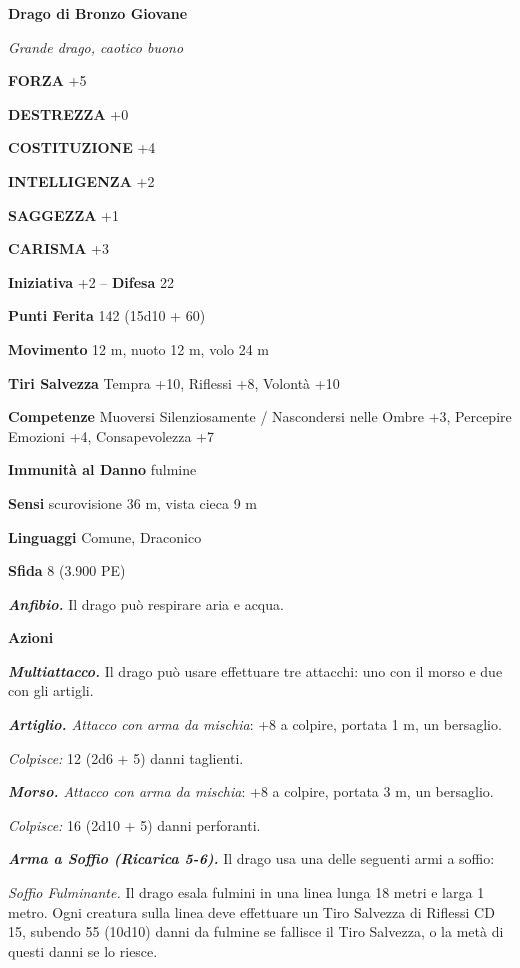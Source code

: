 \begin{multicols}{2}
\medskip{}\textbf{Drago di Bronzo Giovane}

\emph{Grande drago, caotico buono}

\textbf{FORZA} +5

\textbf{DESTREZZA} +0

\textbf{COSTITUZIONE} +4

\textbf{INTELLIGENZA} +2

\textbf{SAGGEZZA} +1

\textbf{CARISMA} +3

\textbf{Iniziativa} +2 -- \textbf{Difesa} 22

\textbf{Punti Ferita} 142 (15d10 + 60)

\textbf{Movimento} 12 m, nuoto 12 m, volo 24 m

\textbf{Tiri Salvezza} Tempra +10, Riflessi +8, Volontà +10

\textbf{Competenze} Muoversi Silenziosamente / Nascondersi nelle Ombre +3, Percepire Emozioni +4, Consapevolezza +7

\textbf{Immunità al Danno} fulmine

\textbf{Sensi} scurovisione 36 m, vista cieca 9 m

\textbf{Linguaggi} Comune, Draconico

\textbf{Sfida} 8 (3.900 PE)

\emph{\textbf{Anfibio.}} Il drago può respirare aria e acqua.

\textbf{Azioni}

\emph{\textbf{Multiattacco.}} Il drago può usare effettuare tre attacchi: uno con il morso e due con gli artigli.

\emph{\textbf{Artiglio.} Attacco con arma da mischia}: +8 a colpire, portata 1 m, un bersaglio.

\emph{Colpisce:} 12 (2d6 + 5) danni taglienti.

\emph{\textbf{Morso.} Attacco con arma da mischia}: +8 a colpire, portata 3 m, un bersaglio.

\emph{Colpisce:} 16 (2d10 + 5) danni perforanti.

\emph{\textbf{Arma a Soffio (Ricarica 5-6).}} Il drago usa una delle seguenti armi a soffio:

\emph{Soffio Fulminante.} Il drago esala fulmini in una linea lunga 18 metri e larga 1 metro. Ogni creatura sulla linea deve effettuare un Tiro Salvezza di Riflessi CD 15, subendo 55 (10d10) danni da fulmine se fallisce il Tiro Salvezza, o la metà di questi danni se lo riesce.


\end{multicols}
